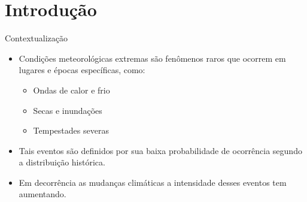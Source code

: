 \documentclass{beamer}
\begin{document}
\section{Introdução}
\begin{frame}{Contextualização}
\begin{itemize}\justifying
    \vfill \item Condições meteorológicas extremas
 são fenômenos raros que ocorrem em lugares e épocas específicas, como:
    \begin{itemize}\justifying
        \vfill \item Ondas de calor e frio
        \vfill \item Secas e inundações
        \vfill \item Tempestades severas
    \vfill \end{itemize}
    \vfill \item Tais eventos são definidos por sua baixa probabilidade de ocorrência segundo a distribuição histórica.
    \vfill \item Em decorrência as mudanças climáticas a intensidade desses eventos tem aumentando.
    \vfill \end{itemize}
\end{frame}
\end{document}
